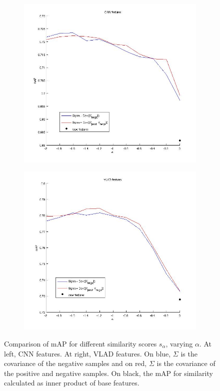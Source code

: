 \documentclass[12pt,letterpaper]{article}
\begin{document}
\begin{figure}[!h]
\centering
\begin{subfigure}[b]{0.45\textwidth}
\includegraphics[width=\textwidth]{whitening_cnn.jpg}
\end{subfigure}
\begin{subfigure}[b]{0.45\textwidth}
\includegraphics[width=\textwidth]{whitening_vlad.jpg}
\end{subfigure}
\caption{Comparison of mAP for different similarity scores $s_{\alpha}$, varying $\alpha$. At left, CNN features. At right, VLAD features. On blue, $\Sigma$ is the covariance of the negative samples and on red, $\Sigma$ is the covariance of the positive and negative samples. On black, the mAP for similarity calculated as inner product of base features.}
\label{Sigma}
\end{figure}
\end{document}
